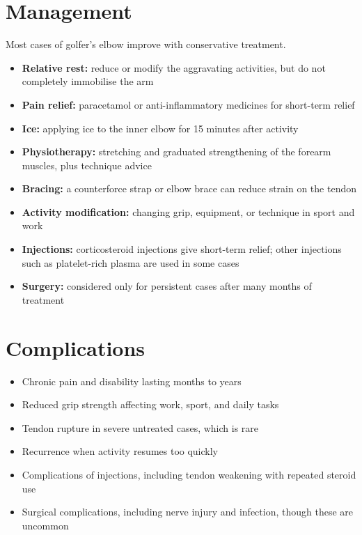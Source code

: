 \section*{Management}
Most cases of golfer's elbow improve with conservative treatment.

\begin{itemize}
    \item \textbf{Relative rest:} reduce or modify the aggravating activities, but do not completely immobilise the arm
    \item \textbf{Pain relief:} paracetamol or anti-inflammatory medicines for short-term relief
    \item \textbf{Ice:} applying ice to the inner elbow for 15 minutes after activity
    \item \textbf{Physiotherapy:} stretching and graduated strengthening of the forearm muscles, plus technique advice
    \item \textbf{Bracing:} a counterforce strap or elbow brace can reduce strain on the tendon
    \item \textbf{Activity modification:} changing grip, equipment, or technique in sport and work
    \item \textbf{Injections:} corticosteroid injections give short-term relief; other injections such as platelet-rich plasma are used in some cases
    \item \textbf{Surgery:} considered only for persistent cases after many months of treatment
\end{itemize}

\section*{Complications}
\begin{itemize}
    \item Chronic pain and disability lasting months to years
    \item Reduced grip strength affecting work, sport, and daily tasks
    \item Tendon rupture in severe untreated cases, which is rare
    \item Recurrence when activity resumes too quickly
    \item Complications of injections, including tendon weakening with repeated steroid use
    \item Surgical complications, including nerve injury and infection, though these are uncommon
\end{itemize}

